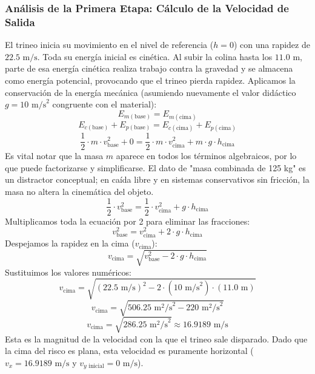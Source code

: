 \documentclass[12pt,a4paper]{article}
\begin{document}
\subsubsection*{Análisis de la Primera Etapa: Cálculo de la Velocidad de Salida}
El trineo inicia su movimiento en el nivel de referencia ($h = 0$) con una rapidez de $22.5 \text{ m/s}$. Toda su energía inicial es cinética. Al subir la colina hasta los $11.0 \text{ m}$, parte de esa energía cinética realiza trabajo contra la gravedad y se almacena como energía potencial, provocando que el trineo pierda rapidez.
Aplicamos la conservación de la energía mecánica (asumiendo nuevamente el valor didáctico $g = 10 \text{ m/s}^2$ congruente con el material):
$$E_{m(\text{base})} = E_{m(\text{cima})}$$
$$E_{c(\text{base})} + E_{p(\text{base})} = E_{c(\text{cima})} + E_{p(\text{cima})}$$
$$\frac{1}{2} \cdot m \cdot v_{\text{base}}^2 + 0 = \frac{1}{2} \cdot m \cdot v_{\text{cima}}^2 + m \cdot g \cdot h_{\text{cima}}$$
Es vital notar que la masa $m$ aparece en todos los términos algebraicos, por lo que puede factorizarse y simplificarse. El dato de "masa combinada de 125 kg" es un distractor conceptual; en caída libre y en sistemas conservativos sin fricción, la masa no altera la cinemática del objeto.
$$\frac{1}{2} \cdot v_{\text{base}}^2 = \frac{1}{2} \cdot v_{\text{cima}}^2 + g \cdot h_{\text{cima}}$$
Multiplicamos toda la ecuación por 2 para eliminar las fracciones:
$$v_{\text{base}}^2 = v_{\text{cima}}^2 + 2 \cdot g \cdot h_{\text{cima}}$$
Despejamos la rapidez en la cima ($v_{\text{cima}}$):
$$v_{\text{cima}} = \sqrt{v_{\text{base}}^2 - 2 \cdot g \cdot h_{\text{cima}}}$$
Sustituimos los valores numéricos:
$$v_{\text{cima}} = \sqrt{(22.5 \text{ m/s})^2 - 2 \cdot (10 \text{ m/s}^2) \cdot (11.0 \text{ m})}$$
$$v_{\text{cima}} = \sqrt{506.25 \text{ m}^2\text{/s}^2 - 220 \text{ m}^2\text{/s}^2}$$
$$v_{\text{cima}} = \sqrt{286.25 \text{ m}^2\text{/s}^2} \approx 16.9189 \text{ m/s}$$
Esta es la magnitud de la velocidad con la que el trineo sale disparado. Dado que la cima del risco es plana, esta velocidad es puramente horizontal ($v_x = 16.9189 \text{ m/s}$ y $v_{y\text{ inicial}} = 0 \text{ m/s}$).
\end{document}
